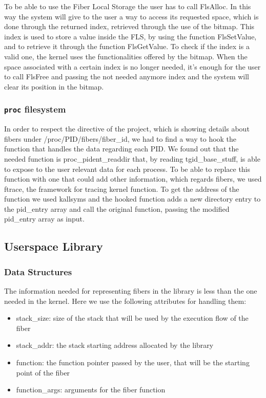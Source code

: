 \documentclass[a4paper,10pt]{article}
\begin{document}
To be able to use the Fiber Local Storage the user has to call FlsAlloc. In this way the system will give to the user a way to access its requested space, which is done through the returned index, retrieved through the use of the bitmap. This index is used to store a value inside the FLS, by using the function FlsSetValue, and to retrieve it through the function FlsGetValue. To check if the index is a valid one, the kernel uses the functionalities offered by the bitmap. When the space associated with a certain index is no longer needed, it’s enough for the user to call FlsFree and passing the not needed anymore index and the system will clear its position in the bitmap.

\subsubsection{\texttt{\/proc} filesystem}
In order to respect the directive of the project, which is showing details about fibers under /proc/PID/fibers/fiber\_id, we had to find a way to hook the function that handles the data regarding each PID. We found out that the needed function is proc\_pident\_readdir that, by reading tgid\_base\_stuff, is able to expose to the user relevant data for each process. To be able to replace this function with one that could add other information, which regards fibers, we used ftrace, the framework for tracing kernel function. To get the address of the function we used kallsyms and the hooked function adds a new directory entry to the pid\_entry array and call the original function, passing the modified pid\_entry array as input.

\subsection{Userspace Library}

\subsubsection{Data Structures}
The information needed for representing fibers in the library is less than the one needed in the kernel. Here we use the following attributes for handling them:
\begin{itemize}
	\item stack\_size: size of the stack that will be used by the execution flow of the fiber
	\item stack\_addr: the stack starting address allocated by the library
	\item function: the function pointer passed by the user, that will be the starting point of the fiber
	\item function\_args: arguments for the fiber function
\end{itemize}
\end{document}
